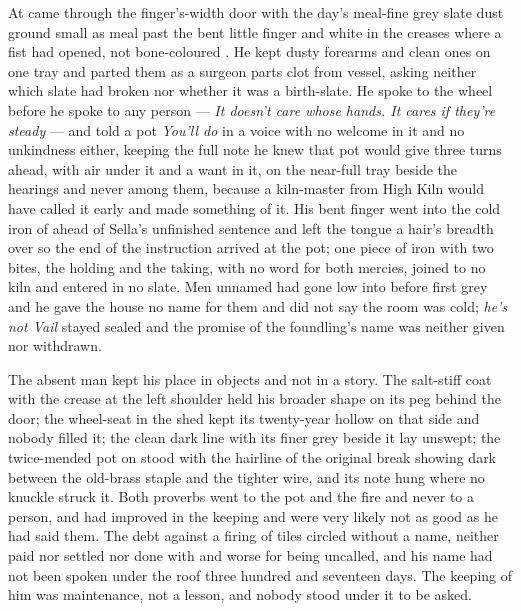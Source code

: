 At   came through the finger's-width door with the day's meal-fine grey slate dust ground small as meal past the bent little finger and white in the creases where a fist had opened, not bone-coloured . He kept dusty forearms and clean ones on one tray and parted them as a surgeon parts clot from vessel, asking neither which slate had broken nor whether it was a birth-slate. He spoke to the wheel before he spoke to any person --- \emph{It doesn't care whose hands. It cares if they're steady} --- and told a pot \emph{You'll do} in a voice with no welcome in it and no unkindness either, keeping the full note he knew that pot would give three turns ahead, with air under it and a want in it, on the near-full tray beside the hearings and never among them, because a kiln-master from High Kiln would have called it early and made something of it. His bent finger went into the cold iron of  ahead of Sella's unfinished sentence and left the tongue a hair's breadth over so the end of the instruction arrived at the pot; one piece of iron with two bites, the holding and the taking, with no  word for both mercies, joined to no kiln and entered in no slate. Men unnamed had gone low into  before first grey and he gave the house no name for them and did not say the room was cold; \emph{he's not Vail} stayed sealed and the promise of the foundling's name was neither given nor withdrawn.

The absent man kept his place in objects and not in a story. The salt-stiff coat with the crease at the left shoulder held his broader shape on its peg behind the door; the wheel-seat in the shed kept its twenty-year hollow on that side and nobody filled it; the clean dark line with its finer grey beside it lay unswept; the twice-mended pot on  stood with the hairline of the original break showing dark between the old-brass staple and the tighter wire, and its note hung where no knuckle struck it. Both proverbs went to the pot and the fire and never to a person, and had improved in the keeping and were very likely not as good as he had said them. The debt against a firing of tiles circled without a name, neither paid nor settled nor done with and worse for being uncalled, and his name had not been spoken under the roof three hundred and seventeen days. The keeping of him was maintenance, not a lesson, and nobody stood under it to be asked.

\scenebreak


